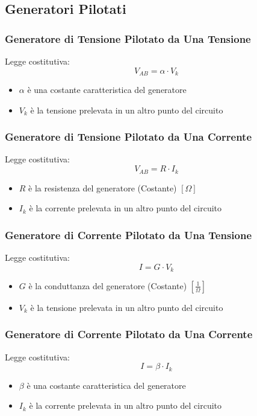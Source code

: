 \documentclass[../main.tex]{subfiles}
\begin{document}
	\subsection{Generatori Pilotati}
	\subsubsection{Generatore di Tensione Pilotato da Una Tensione}
	Legge costitutiva:
	\[V_{AB} = \alpha \cdot V_k\]
	\begin{itemize}
		\item $\alpha$ è una costante caratteristica del generatore
		\item $V_k$ è la tensione prelevata in un altro punto del circuito
	\end{itemize}
	\subsubsection{Generatore di Tensione Pilotato da Una Corrente}
	Legge costitutiva:
	\[V_{AB} = R \cdot I_k\]
	\begin{itemize}
		\item $R$ è la resistenza del generatore (Costante) $[\Omega]$
		\item $I_k$ è la corrente prelevata in un altro punto del circuito
	\end{itemize}
	\subsubsection{Generatore di Corrente Pilotato da Una Tensione}
	Legge costitutiva:
	\[I = G \cdot V_k\]
	\begin{itemize}
		\item $G$ è la conduttanza del generatore (Costante) $[\frac{1}{\Omega}]$
		\item $V_k$ è la tensione prelevata in un altro punto del circuito
	\end{itemize}
	\subsubsection{Generatore di Corrente Pilotato da Una Corrente}
	Legge costitutiva:
	\[I = \beta \cdot I_k\]
	\begin{itemize}
	\item $\beta$ è una costante caratteristica del generatore
	\item $I_k$ è la corrente prelevata in un altro punto del circuito
	\end{itemize}
\end{document}
